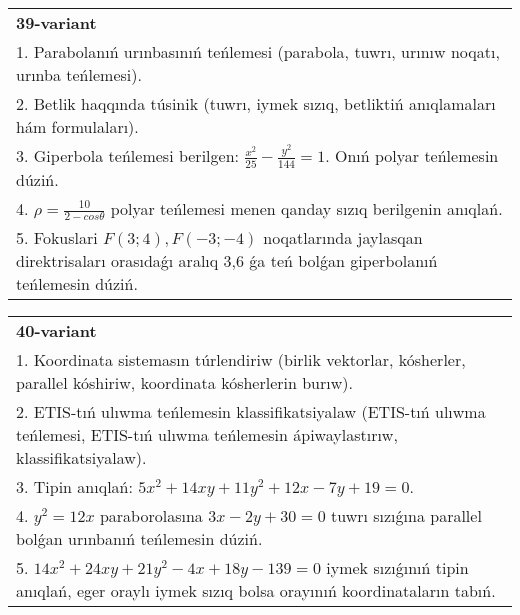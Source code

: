 \documentclass{article}
\begin{document}
\begin{tabular}{m{17cm}}
\textbf{39-variant}\\
1. Parabolanıń urınbasınıń teńlemesi (parabola, tuwrı, urınıw noqatı, urınba teńlemesi).\\

2. Betlik haqqında túsinik (tuwrı, iymek sızıq, betliktiń anıqlamaları hám formulaları).\\

3. Giperbola teńlemesi berilgen: $\frac{x^{2}}{25}-\frac{y^{2}}{144}=1$. Onıń polyar teńlemesin dúziń.\\

4. $\rho = \frac{10}{2 - cos\theta}$ polyar teńlemesi menen qanday sızıq berilgenin anıqlań.  \\

5. Fokuslari $F(3;4), F(-3;-4)$ noqatlarında jaylasqan direktrisaları orasıdaǵı aralıq 3,6 ǵa teń bolǵan giperbolanıń teńlemesin dúziń.  
\end{tabular}
\vspace{1cm}


\begin{tabular}{m{17cm}}
\textbf{40-variant}\\
1. Koordinata sistemasın túrlendiriw (birlik vektorlar, kósherler, parallel kóshiriw, koordinata kósherlerin burıw).\\

2. ETIS-tıń ulıwma teńlemesin klassifikatsiyalaw (ETIS-tıń ulıwma teńlemesi, ETIS-tıń ulıwma teńlemesin ápiwaylastırıw, klassifikatsiyalaw).\\

3. Tipin anıqlań: $5 x^{2}+14 xy+11 y^{2}+12 x-7 y+19=0$.\\

4. $y^{2} = 12x$ paraborolasına $3x - 2y + 30 = 0$ tuwrı sızıǵına parallel bolǵan urınbanıń teńlemesin dúziń.  \\

5. $14x^{2} + 24xy + 21y^{2} - 4x + 18y - 139 = 0$ iymek sızıǵınıń tipin anıqlań, eger oraylı iymek sızıq bolsa orayınıń koordinataların tabıń.  
\end{tabular}
\vspace{1cm}
\end{document}
